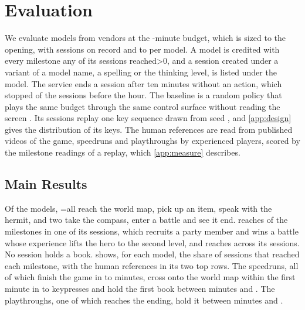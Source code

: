 \documentclass{article} %
\begin{document}
\section{Evaluation}
\label{sec:results}

We evaluate \NmodelsDistinct{} models from \Nvendors{} vendors at the
\NbudgetMin{}-minute budget, which is sized to the opening, with \NsessionsPlayed{} sessions on record and \LsessionsMin{} to
\LsessionsMax{} per model. A model is credited with every milestone any of its
sessions reached\ifnum\Naliased>0{}, and a session created under a variant of a model name, a spelling or the thinking level, is listed under the model\fi. The service ends a session after ten minutes without an action, which stopped \NidleSessions{} of the \NsessionsPlayed{} sessions before the hour. The baseline is a random policy that plays the same budget through the same control surface without reading the screen \citep{mnih2015humanlevel,hafner2021benchmarking,arc2026arcagi3}. Its \NrandomRuns{} sessions replay one key sequence drawn from seed \QrandomSeed{}, and \cref{app:design} gives the distribution of its keys. The human references are read from published videos of the game, \NhumanSpeedruns{} speedruns and \NhumanPlaythroughs{} playthroughs by experienced players, scored by the milestone readings of a replay, which \cref{app:measure} describes.

\subsection{Main Results}

Of the \Lmodels{} models, \ifnum\Lmap=\Lmodels all \Lmap{}\else\Lmap{}\fi{} reach the world map, \Litem{} pick up an item, \Lhermit{} speak with the hermit, and two take the compass, enter a battle and see it end. \LtopLabel{} reaches \Ltop{} of the \Lrungs{} milestones in one of its \LtopSessions{} sessions, which recruits a party member and wins a battle whose experience lifts the hero to the second level, and \LsecondLabel{} reaches \Lsecond{} across its \LsecondSessions{} sessions. No session holds a book.  shows, for each model, the share of sessions that reached each milestone, with the human references in its two top rows. The speedruns, all of which finish the game in \LhumanSpeedCompletionMin{} to \LhumanSpeedCompletionMax{} minutes, cross onto the world map within the first minute in \LhumanSpeedStepsMin{} to \LhumanSpeedStepsMax{} keypresses and hold the first book between minutes \LhumanSpeedBookFirst{} and \LhumanSpeedBookLast{}. The playthroughs, one of which reaches the ending, hold it between minutes \LhumanPlayBookFirst{} and \LhumanPlayBookLast{}.
\end{document}
